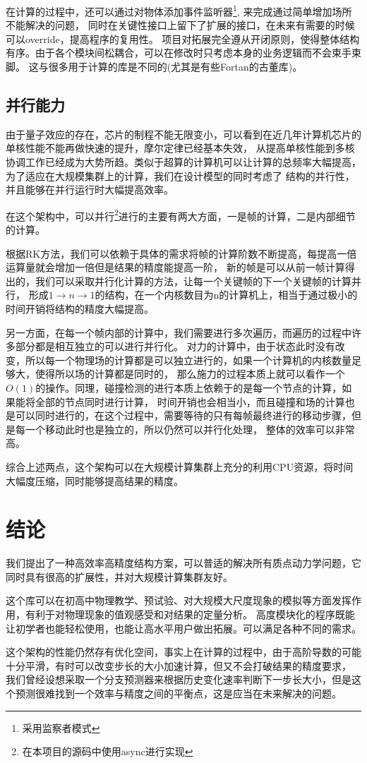 在计算的过程中，还可以通过对物体添加事件监听器\footnote{采用监察者模式},
来完成通过简单增加场所不能解决的问题，
同时在关键性接口上留下了扩展的接口，在未来有需要的时候可以override，提高程序的复用性。
项目对拓展完全遵从开闭原则，使得整体结构有序。由于各个模块间松耦合，可以在修改时只考虑本身的业务逻辑而不会束手束脚。
这与很多用于计算的库是不同的(尤其是有些Fortan的古董库)。
\section{并行能力}
由于量子效应的存在，芯片的制程不能无限变小，可以看到在近几年计算机芯片的单核性能不能再做快速的提升，摩尔定律已经基本失效，
从提高单核性能到多核协调工作已经成为大势所趋。类似于超算的计算机可以让计算的总频率大幅提高，为了适应在大规模集群上的计算，我们在设计模型的同时考虑了
结构的并行性，并且能够在并行运行时大幅提高效率。

在这个架构中，可以并行\footnote{在本项目的源码中使用async进行实现}进行的主要有两大方面，一是帧的计算，二是内部细节的计算。

根据RK方法，我们可以依赖于具体的需求将帧的计算阶数不断提高，每提高一倍运算量就会增加一倍但是结果的精度能提高一阶，
新的帧是可以从前一帧计算得出的，我们可以采取并行化计算的方法，让每一个关键帧的下一个关键帧的计算并行，
形成$1\rightarrow n \rightarrow 1$的结构，在一个内核数目为n的计算机上，相当于通过极小的时间开销将结构的精度大幅提高。

另一方面，在每一个帧内部的计算中，我们需要进行多次遍历，而遍历的过程中许多部分都是相互独立的可以进行并行化。
对力的计算中，由于状态此时没有改变，所以每一个物理场的计算都是可以独立进行的，如果一个计算机的内核数量足够大，使得所以场的计算都是同时的，
那么施力的过程本质上就可以看作一个$O(1)$的操作。同理，碰撞检测的进行本质上依赖于的是每一个节点的计算，如果能将全部的节点同时进行计算，
时间开销也会相当小，而且碰撞和场的计算也是可以同时进行的，在这个过程中，需要等待的只有每帧最终进行的移动步骤，但是每一个移动此时也是独立的，所以仍然可以并行化处理，
整体的效率可以非常高。

综合上述两点，这个架构可以在大规模计算集群上充分的利用CPU资源，将时间大幅度压缩，同时能够提高结果的精度。
\chapter{结论}
我们提出了一种高效率高精度结构方案，可以普适的解决所有质点动力学问题，它同时具有很高的扩展性，并对大规模计算集群友好。

这个库可以在初高中物理教学、预试验、对大规模大尺度现象的模拟等方面发挥作用，有利于对物理现象的值观感受和对结果的定量分析。
高度模块化的程序既能让初学者也能轻松使用，也能让高水平用户做出拓展。可以满足各种不同的需求。

这个架构的性能仍然存有优化空间，事实上在计算的过程中，由于高阶导数的可能十分平滑，有时可以改变步长的大小加速计算，但又不会打破结果的精度要求，
我们曾经设想采取一个分支预测器来根据历史变化速率判断下一步长大小，但是这个预测很难找到一个效率与精度之间的平衡点，这是应当在未来解决的问题。
